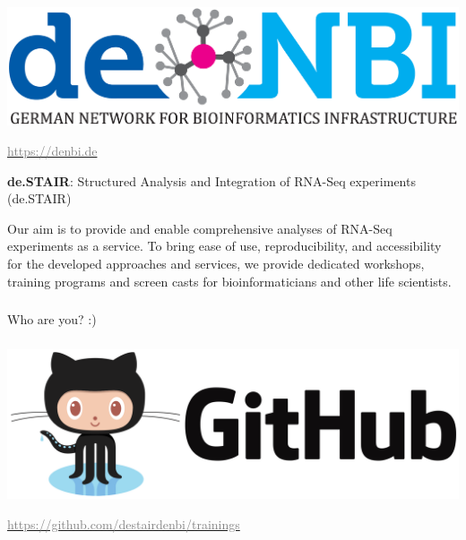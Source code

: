 \documentclass[x11names, svgnames]{beamer}
\begin{document}
\begin{frame}
  \frametitle{\one}
  \begin{center}
    \includegraphics[scale=0.08]{images/logo_denbi}
  \end{center}
  \begin{center}
    \footnotesize{\href{https://denbi.de}{\textcolor{gray}{https://denbi.de}}}
  \end{center}
  \begin{center}
    \vspace{2em}
    \textbf{de.STAIR}: Structured Analysis and Integration of RNA-Seq experiments (de.STAIR)
  \end{center}
  \begin{center}
    \small{Our aim is to provide and enable comprehensive analyses of RNA-Seq experiments as a service. To bring ease of use, reproducibility, and accessibility for the developed approaches and services, we provide dedicated workshops, training programs and screen casts for bioinformaticians and other life scientists.}
  \end{center}
\end{frame}
\begin{frame}
  \frametitle{\one}
  \begin{center}
    Who are you? :)
  \end{center}
\end{frame}



%
%
%
\begin{frame}
  \frametitle{\two}
  \begin{center}
    \includegraphics[scale=0.1]{images/logo_github}
  \end{center}
  \begin{center}
    \footnotesize{\href{https://github.com/destairdenbi/trainings}{\textcolor{gray}{https://github.com/destairdenbi/trainings}}}
  \end{center}
\end{frame}
\end{document}

